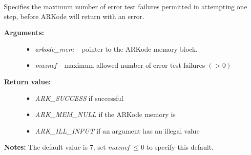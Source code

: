 \documentclass[letterpaper,10pt,english]{sphinxmanual}
\begin{document}
\begin{fulllineitems}
\label{c_interface/User_callable:ARKodeSetMaxErrTestFails}
Specifies the maximum number of error test failures
permitted in attempting one step, before ARKode
will return with an error.
\begin{description}
\item[{\textbf{Arguments:}}] \leavevmode\begin{itemize}
\item {} 
\emph{arkode\_mem} -- pointer to the ARKode memory block.

\item {} 
\emph{maxnef} -- maximum allowed number of error test failures $(>0)$

\end{itemize}

\item[{\textbf{Return value:}}] \leavevmode\begin{itemize}
\item {} 
\emph{ARK\_SUCCESS} if successful

\item {} 
\emph{ARK\_MEM\_NULL} if the ARKode memory is 

\item {} 
\emph{ARK\_ILL\_INPUT} if an argument has an illegal value

\end{itemize}

\end{description}

\textbf{Notes:} The default value is 7; set \emph{maxnef} $\le 0$
to specify this default.

\end{fulllineitems}

\end{document}
